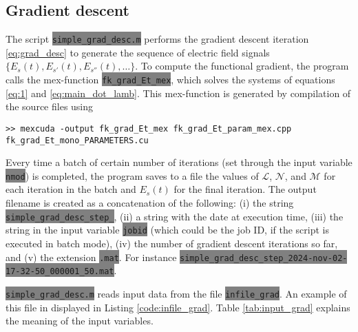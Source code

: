 \documentclass{article}
\newcommand{\code}[1]{\colorbox{gray}{\lstinline|#1|}}
\begin{document}
\subsection{Gradient descent}
The script \code{simple_grad_desc.m} performs the gradient descent iteration \eqref{eq:grad_desc} to generate the sequence of electric field signals $\{E_s(t), E_{s'}(t), E_{s''}(t),\ldots\}$. To compute the functional gradient, the program calls the mex-function \code{fk_grad_Et_mex}, which solves the systems of equations \eqref{eq:1} and \eqref{eq:main_dot_lamb}. This mex-function is generated by compilation of the source files using
\begin{lstlisting}
>> mexcuda -output fk_grad_Et_mex fk_grad_Et_param_mex.cpp  fk_grad_Et_mono_PARAMETERS.cu
\end{lstlisting}

Every time a  batch of certain number of iterations (set through the input variable \code{nmod}) is completed, the program saves to a file the values of $\mathcal{L}$, $\mathcal{N}$, and $\mathcal{M}$ for each iteration in the batch and $E_s(t)$ for the final iteration. The output filename is created as a concatenation of the following: (i) the string \code{simple_grad_desc_step_}, (ii) a string with the date at execution time, (iii) the string in the input variable \code{jobid} (which could be the job ID, if the script is executed in batch mode), (iv) the number of gradient descent iterations so far, and (v) the extension \code{.mat}. For instance \code{simple_grad_desc_step_2024-nov-02-17-32-50_000001_50.mat}.

\code{simple_grad_desc.m} reads input data from the file \code{infile_grad}. An example of this file in displayed in Listing \ref{code:infile_grad}. Table \ref{tab:input_grad} explains the meaning of the input variables.

\end{document}
